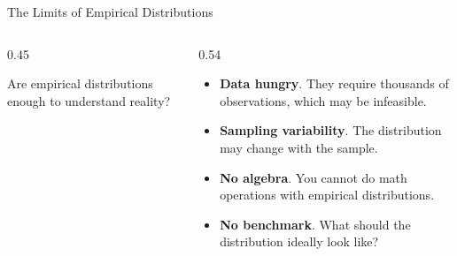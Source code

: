 \documentclass[9pt,english,aspectratio=169]{beamer}
\begin{document}
\begin{frame}{The Limits of Empirical Distributions}

  \begin{columns}
    \begin{column}{0.45\textwidth}
      
      \begin{questionbox}
        Are empirical distributions enough to understand reality?
      \end{questionbox}

    \end{column}
    \begin{column}{0.54\textwidth}
    \vspace{0.2em}
      \begin{itemize}
        \item \textbf{Data hungry}. They require thousands of observations, which may be infeasible.
        \item \textbf{Sampling variability}. The distribution may change with the sample.
        \item \textbf{No algebra}. You cannot do math operations with empirical distributions. 
        \item \textbf{No benchmark}. What should the distribution ideally look like?
     \end{itemize}  
  \end{column}
  \end{columns}
  
\end{frame}
\end{document}
